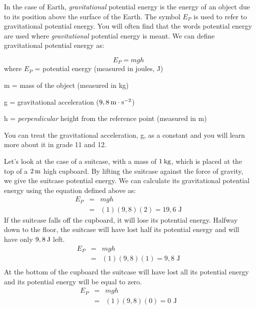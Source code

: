       \label{m38784*id66167}In the case of Earth, \textsl{gravitational} potential energy is the energy of an object due to its position above the surface of the Earth. The symbol ${E}_{P}$ is used to refer to gravitational potential energy. 
You will often find that the words potential energy are used where \textsl{gravitational} potential energy is meant. 
We can define gravitational potential energy as:\par 
      \label{m38784*uid45}\nopagebreak\noindent{}
    \begin{equation*}
    {E}_{P}=mgh
      \end{equation*}
where
${E}_{P}$ = potential energy (measured in joules, J)\par 
      \label{m38784*id66229}m = mass of the object (measured in kg)\par 
      \label{m38784*id66234}g = gravitational acceleration ($9,8\phantom{\rule{2pt}{0ex}}\text{m}\ensuremath{\cdot}\text{s}{}^{-2}$)\par 
      \label{m38784*id66266}h = \textit{perpendicular} height from the reference point (measured in m)\par 
      \label{m38784*eip-306}

You can treat the gravitational acceleration, g, as a constant and you will learn more about it in grade 11 and 12. 


Let's look at the case of a 
suitcase, with a mass of $1\phantom{\rule{2pt}{0ex}}\text{kg}$, which is placed at the top of a $2\phantom{\rule{2pt}{0ex}}\text{m}$ high cupboard. By lifting the suitcase against the force of gravity, we give the suitcase potential energy. We can calculate its gravitational potential energy using the equation defined above as:
\begin{eqnarray*}
E_{P} & = & mgh \\
& = & (1)(9,8)(2) = 19,6 \text{ J}
\end{eqnarray*}
If the suitcase falls off the cupboard, it will lose its potential energy. Halfway down to the floor, the suitcase will have lost half its potential energy and will have only $9,8\phantom{\rule{2pt}{0ex}}\text{J}$ left. 
\begin{eqnarray*}
E_{P} & = & mgh \\
& = & (1)(9,8)(1) = 9,8 \text{ J} \\
\end{eqnarray*}
At the bottom of the cupboard the suitcase will have lost all its potential energy and its potential energy will be equal to zero.
\begin{eqnarray*}
E_{P} & = & mgh \\
& = & (1)(9,8)(0) = 0 \text{ J} \\
\end{eqnarray*}

